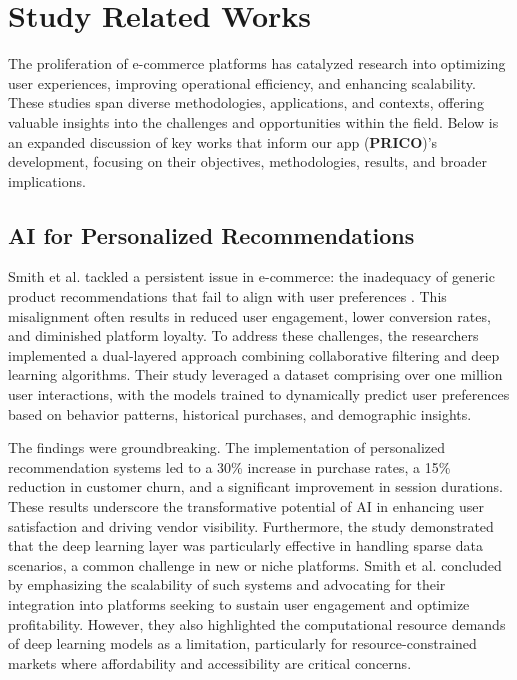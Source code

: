 \documentclass[12pt]{report}
\begin{document}
\section{Study Related Works}

The proliferation of e-commerce platforms has catalyzed research into optimizing user
experiences, improving operational efficiency, and enhancing scalability. These studies span
diverse methodologies, applications, and contexts, offering valuable insights into the
challenges and opportunities within the field. Below is an expanded discussion of key works
that inform our app (\textbf{PRICO})’s development, focusing on their objectives, methodologies,
results, and broader implications.

\subsection*{AI for Personalized Recommendations}

Smith et al. tackled a persistent issue in e-commerce: the inadequacy of generic product
recommendations that fail to align with user preferences \cite{c16}. This misalignment often results
in reduced user engagement, lower conversion rates, and diminished platform loyalty. To
address these challenges, the researchers implemented a dual-layered approach combining
collaborative filtering and deep learning algorithms. Their study leveraged a dataset
comprising over one million user interactions, with the models trained to dynamically predict
user preferences based on behavior patterns, historical purchases, and demographic insights.

The findings were groundbreaking. The implementation of personalized recommendation
systems led to a 30\% increase in purchase rates, a 15\% reduction in customer churn, and a
significant improvement in session durations. These results underscore the transformative
potential of AI in enhancing user satisfaction and driving vendor visibility. Furthermore, the
study demonstrated that the deep learning layer was particularly effective in handling sparse
data scenarios, a common challenge in new or niche platforms. Smith et al. concluded by
emphasizing the scalability of such systems and advocating for their integration into
platforms seeking to sustain user engagement and optimize profitability. However, they also
highlighted the computational resource demands of deep learning models as a limitation,
particularly for resource-constrained markets where affordability and accessibility are critical
concerns\cite{c16}.
\end{document}
